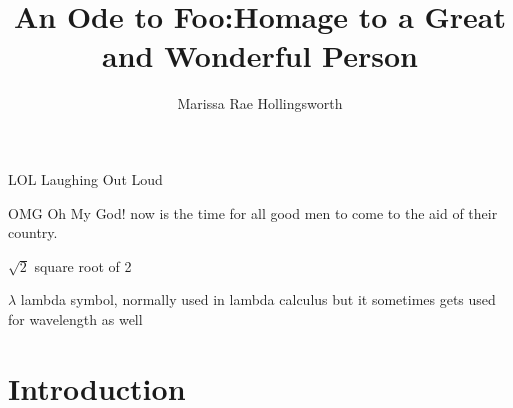 \documentclass{bsu-ms}
\title{An Ode to Foo:\titleBreak Homage to a Great and Wonderful Person}
\author{Marissa Rae Hollingsworth}
\begin{document}
\frontmatter  %

\buildFrontPages %

\begin{listAbbreviations}
  \item[LOL] Laughing Out Loud
  \item[OMG] Oh My God! now is the time for all good men to come to the
    aid of their country.
\end{listAbbreviations}


\begin{listSymbols}
  \item[$\sqrt{2}$] square root of 2
  \item[$\lambda$] lambda symbol, normally used in lambda calculus but
    it sometimes gets used for wavelength as well
\end{listSymbols}



\mainmatter


%
%

\chapter{Introduction}

%
%
\end{document}
